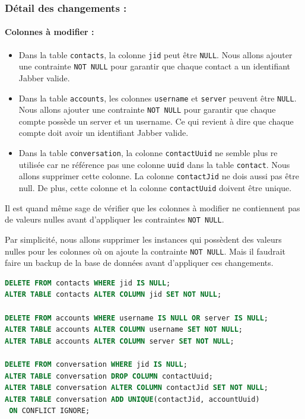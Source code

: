 \documentclass[a4paper,11pt]{article}
\begin{document}
\subsubsection*{Détail des changements :}

\paragraph{Colonnes à modifier :}
\begin{itemize}
	\item Dans la table \texttt{contacts}, la colonne \texttt{jid} peut être \texttt{NULL}. Nous allons ajouter une contrainte \texttt{NOT NULL} pour garantir que chaque contact a un identifiant Jabber valide.
	\item Dans la table \texttt{accounts}, les colonnes \texttt{username} et \texttt{server} peuvent être \texttt{NULL}. Nous allons ajouter une contrainte \texttt{NOT NULL} pour garantir que chaque compte possède un server et un username. Ce qui revient à dire que chaque compte doit avoir un identifiant Jabber valide.
	\item Dans la table \texttt{conversation}, la colonne \texttt{contactUuid} ne semble plus re utilisée car ne référence pas une colonne \texttt{uuid} dans la table \texttt{contact}. Nous allons supprimer cette colonne. La colonne \texttt{contactJid} ne dois aussi pas être null. De plus, cette colonne et la colonne \texttt{contactUuid} doivent être unique. 
\end{itemize}

Il est  quand même sage de vérifier que les colonnes à modifier ne contiennent pas de valeurs nulles avant d'appliquer les contraintes \texttt{NOT NULL}.

Par simplicité, nous allons supprimer les instances qui possèdent des valeurs nulles pour les colonnes où on ajoute la contrainte \texttt{NOT NULL}. Mais il faudrait faire un backup de la base de données avant d'appliquer ces changements.

\begin{lstlisting}[language=SQL]
DELETE FROM contacts WHERE jid IS NULL;
ALTER TABLE contacts ALTER COLUMN jid SET NOT NULL;

DELETE FROM accounts WHERE username IS NULL OR server IS NULL;
ALTER TABLE accounts ALTER COLUMN username SET NOT NULL;
ALTER TABLE accounts ALTER COLUMN server SET NOT NULL;

DELETE FROM conversation WHERE jid IS NULL;
ALTER TABLE conversation DROP COLUMN contactUuid;
ALTER TABLE conversation ALTER COLUMN contactJid SET NOT NULL;
ALTER TABLE conversation ADD UNIQUE(contactJid, accountUuid)
 ON CONFLICT IGNORE;
\end{lstlisting}
\end{document}
